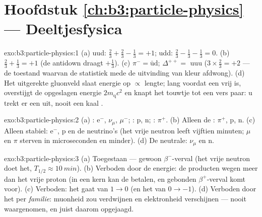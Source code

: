 \section*{Hoofdstuk \ref{ch:b3:particle-physics} --- Deeltjesfysica}

\begin{solution}{exo:b3:particle-physics:1}
(a) uud: $\tfrac23 + \tfrac23 - \tfrac13 = +1$; udd: $\tfrac23 -
\tfrac13 - \tfrac13 = 0$. (b) $\tfrac23 + \tfrac13 = +1$ (de
antidown draagt $+\tfrac13$). (c) $\pi^- =
\bar{\text{u}}\text{d}$; $\Delta^{++} = $ uuu ($3\times\tfrac23 =
+2$ --- de toestand waarvan de statistiek mede de uitvinding van
kleur afdwong). (d) Het uitgerekte gluonveld slaat energie op
$\propto$ lengte; lang voordat een  vrij is, overstijgt de opgeslagen energie
$2m_{\text{q}}c^2$ en knapt het touwtje tot een vers
paar: u trekt er een  uit, nooit een kaal .
\end{solution}

\begin{solution}{exo:b3:particle-physics:2}
(a) : e$^-$, $\nu_\mu$, $\mu^-$; : p, n; :
$\pi^+$. (b) Alleen de : $\pi^+$, p, n. (c) Alleen stabiel:
e$^-$, p en de neutrino's (het vrije neutron leeft vijftien
minuten; $\mu$ en $\pi$ sterven in microseconden en minder). (d) De
neutrale: $\nu_\mu$ en n.
\end{solution}

\begin{solution}{exo:b3:particle-physics:3}
(a) Toegestaan --- gewoon $\beta^-$-verval (het vrije neutron doet
het, $T_{1/2} \approx \qty{10}{min}$). (b) Verboden door de energie:
de producten wegen meer dan het vrije proton (in een kern kan de
 betalen, en gebonden $\beta^+$-verval komt voor). (c)
Verboden: het  gaat van $1 \to 0$ (en het 
van $0 \to -1$). (d) Verboden door het  per \emph{familie}:
muonheid zou verdwijnen en elektronheid verschijnen --- nooit
waargenomen, en juist daarom opgejaagd.
\end{solution}

